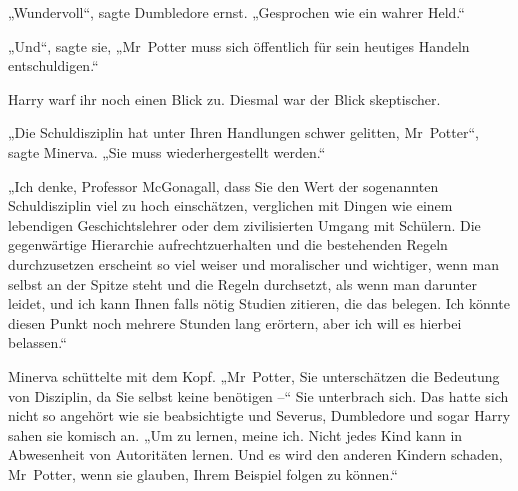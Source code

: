 „Wundervoll“, sagte Dumbledore ernst. „Gesprochen wie ein wahrer Held.“

„Und“, sagte sie, „Mr~Potter muss sich öffentlich für sein heutiges Handeln entschuldigen.“

Harry warf ihr noch einen Blick zu. Diesmal war der Blick skeptischer.

„Die Schuldisziplin hat unter Ihren Handlungen schwer gelitten, Mr~Potter“, sagte Minerva. „Sie muss wiederhergestellt werden.“

„Ich denke, Professor McGonagall, dass Sie den Wert der sogenannten Schuldisziplin viel zu hoch einschätzen, verglichen mit Dingen wie einem lebendigen Geschichtslehrer oder dem zivilisierten Umgang mit Schülern. Die gegenwärtige Hierarchie aufrechtzuerhalten und die bestehenden Regeln durchzusetzen erscheint so viel weiser und moralischer und wichtiger, wenn man selbst an der Spitze steht und die Regeln durchsetzt, als wenn man darunter leidet, und ich kann Ihnen falls nötig Studien zitieren, die das belegen. Ich könnte diesen Punkt noch mehrere Stunden lang erörtern, aber ich will es hierbei belassen.“

Minerva schüttelte mit dem Kopf. „Mr~Potter, Sie unterschätzen die Bedeutung von Disziplin, da Sie selbst keine benötigen –“ Sie unterbrach sich. Das hatte sich nicht so angehört wie sie beabsichtigte und Severus, Dumbledore und sogar Harry sahen sie komisch an. „Um zu lernen, meine ich. Nicht jedes Kind kann in Abwesenheit von Autoritäten lernen. Und es wird den anderen Kindern schaden, Mr~Potter, wenn sie glauben, Ihrem Beispiel folgen zu können.“

